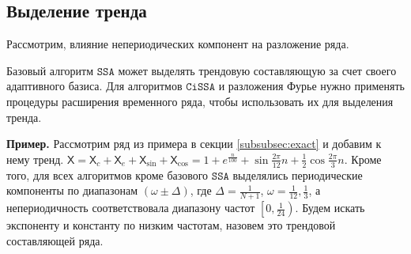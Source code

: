 \documentclass[12pt, specialist, subf
]{disser}
\theoremstyle{definition}
\newcommand{\SSA}{\texttt{SSA}}
\newcommand{\CISSA}{\texttt{CiSSA}}
\newcommand{\TS}{\mathsf{X}}
\begin{document}
%
%


\subsection{Выделение тренда}

\label{subsubsec:trend}

Рассмотрим, влияние непериодических компонент на разложение ряда.

Базовый алгоритм $\SSA$ может выделять трендовую составляющую за счет своего адаптивного базиса. Для алгоритмов $\CISSA$ и разложения Фурье нужно применять процедуры расширения временного ряда, чтобы использовать их для выделения тренда.

\textbf{\large{Пример.}} Рассмотрим ряд из примера в секции \ref{subsubsec:exact} и добавим к нему тренд. $\TS = \TS_{c} + \TS_e + \TS_{\sin} + \TS_{\cos} = 1 + e^{\frac{n}{100}} + \sin{\frac{2\pi}{12}n} + \frac{1}{2}\cos{\frac{2\pi}{3}n}$.
Кроме того, для всех алгоритмов кроме базового $\SSA$ выделялись периодические компоненты по диапазонам $\left(\omega \pm \Delta \right)$, где $\Delta = \frac{1}{N+1}$, $\omega = \frac{1}{12}, \frac{1}{3}$, а непериодичность соответствовала диапазону частот $\left[0, \frac{1}{24} \right)$.
Будем искать экспоненту и константу по низким частотам, назовем это трендовой составляющей ряда.
\end{document}
